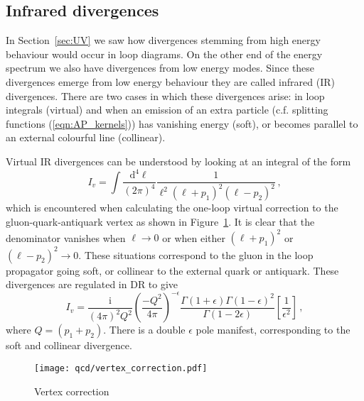 \documentclass[main.tex]{subfiles}
\begin{document}
\subsection{Infrared divergences}\label{sec:IR_divergences}
    In Section~\ref{sec:UV} we saw how divergences
    stemming from high energy behaviour would occur
    in loop diagrams. On the other end of the energy
    spectrum we also have divergences from low energy
    modes. Since these divergences emerge from low energy
    behaviour they are called infrared (IR) divergences. There
    are two cases in which these divergences arise:
    in loop integrals (virtual) and when an emission
    of an extra particle (c.f. splitting functions
    (\ref{eqn:AP_kernels})) has vanishing energy (soft),
    or becomes parallel to an external colourful line (collinear).

    Virtual IR divergences can be understood by looking
    at an integral of the form
    \begin{equation}\label{eqn:virtual_IR_integral}
        I_{v} = \int \dfrac{\mathrm{d}^{4}\ell}{(2\pi)^{4}} \dfrac{1}{\ell^{2}(\ell+p_{1})^{2}(\ell-p_{2})^{2}} \, ,
    \end{equation}
    which is encountered when calculating the one-loop
    virtual correction to the gluon-quark-antiquark vertex
    as shown in Figure~\ref{fig:vertex_correction}.
    It is clear that the denominator vanishes when $\ell \rightarrow 0$
    or when either $(\ell + p_{1})^{2}$ or $(\ell - p_{2})^{2} \rightarrow 0$.
    These situations correspond to the gluon in the loop propagator
    going soft, or collinear to the external quark or antiquark.
    These divergences are regulated in DR to give
    \begin{equation}\label{eqn:virtual_IR_DR}
        I_{v} = \dfrac{\mathrm{i}}{(4\pi)^{2}Q^{2}}\left(\dfrac{-Q^{2}}{4\pi}\right)^{-\epsilon}\dfrac{\Gamma(1+\epsilon)\Gamma(1-\epsilon)^{2}}{\Gamma(1-2\epsilon)}\left[\dfrac{1}{\epsilon^{2}}\right] \, ,
    \end{equation}
    where $Q = (p_{1} + p_{2})$. There is a double $\epsilon$ pole manifest,
    corresponding to the soft and collinear divergence.

    \begin{figure}
        \texttt{[image: qcd/vertex\_correction.pdf]}
        \caption{Vertex correction}
        \label{fig:vertex_correction}
    \end{figure}
\end{document}
